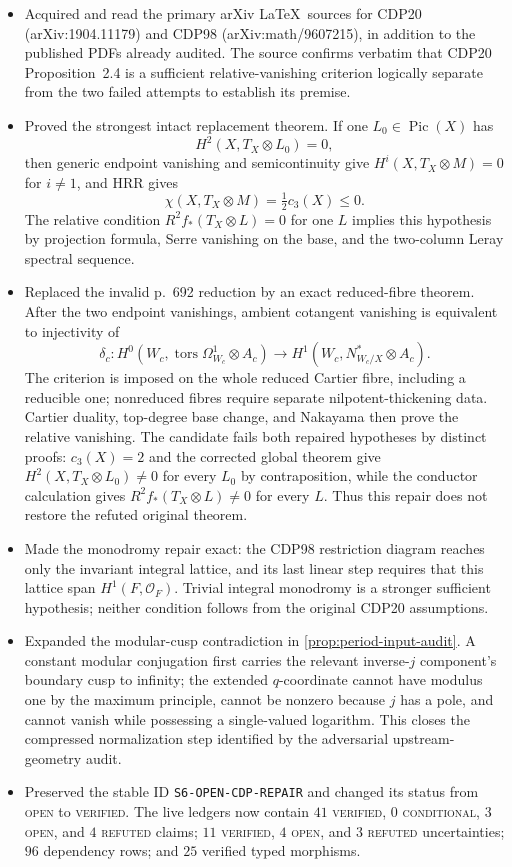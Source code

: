 \begin{itemize}[leftmargin=1.8em]
\item Acquired and read the primary arXiv \LaTeX\ sources for CDP20
(arXiv:1904.11179) and CDP98 (arXiv:math/9607215), in addition to the
published PDFs already audited.  The source confirms verbatim that CDP20
Proposition~2.4 is a sufficient relative-vanishing criterion logically
separate from the two failed attempts to establish its premise.
\item Proved the strongest intact replacement theorem.  If one
\(L_0\in\operatorname{Pic}(X)\) has
\[
 H^2(X,T_X\otimes L_0)=0,
\]
then generic endpoint vanishing and semicontinuity give
\(H^i(X,T_X\otimes M)=0\) for \(i\ne1\), and HRR gives
\[
 \chi(X,T_X\otimes M)=\tfrac12c_3(X)\le0.
\]
The relative condition \(R^2f_*(T_X\otimes L)=0\) for one \(L\) implies
this hypothesis by projection formula, Serre vanishing on the base, and the
two-column Leray spectral sequence.
\item Replaced the invalid p.~692 reduction by an exact reduced-fibre
theorem.  After the two endpoint vanishings, ambient cotangent vanishing is
equivalent to injectivity of
\[
 \delta_c:H^0(W_c,\operatorname{tors}\Omega^1_{W_c}\otimes A_c)
 \longrightarrow H^1(W_c,N^*_{W_c/X}\otimes A_c).
\]
The criterion is imposed on the whole reduced Cartier fibre, including a
reducible one; nonreduced fibres require separate nilpotent-thickening data.
Cartier duality, top-degree base change, and Nakayama then prove the relative
vanishing.  The candidate fails both repaired hypotheses by distinct proofs:
\(c_3(X)=2\) and the corrected global theorem give
\(H^2(X,T_X\otimes L_0)\ne0\) for every \(L_0\) by contraposition, while the
conductor calculation gives \(R^2f_*(T_X\otimes L)\ne0\) for every \(L\).
Thus this repair does not restore the refuted original theorem.
\item Made the monodromy repair exact: the CDP98 restriction diagram reaches
only the invariant integral lattice, and its last linear step requires that
this lattice span \(H^1(F,\mathcal O_F)\).  Trivial integral monodromy is a
stronger sufficient hypothesis; neither condition follows from the original
CDP20 assumptions.
\item Expanded the modular-cusp contradiction in
\cref{prop:period-input-audit}.  A constant modular conjugation first carries
the relevant inverse-\(j\) component's boundary cusp to infinity; the
extended \(q\)-coordinate cannot have modulus one by the maximum principle,
cannot be nonzero because \(j\) has a pole, and cannot vanish while possessing
a single-valued logarithm.  This closes the compressed normalization step
identified by the adversarial upstream-geometry audit.
\item Preserved the stable ID \texttt{S6-OPEN-CDP-REPAIR} and changed its
status from \textsc{open} to \textsc{verified}.  The live ledgers now contain
\(41\) \textsc{verified}, \(0\) \textsc{conditional}, \(3\) \textsc{open},
and \(4\) \textsc{refuted} claims; \(11\) \textsc{verified},
\(4\) \textsc{open}, and \(3\) \textsc{refuted} uncertainties; \(96\)
dependency rows; and \(25\) verified typed morphisms.
\end{itemize}

